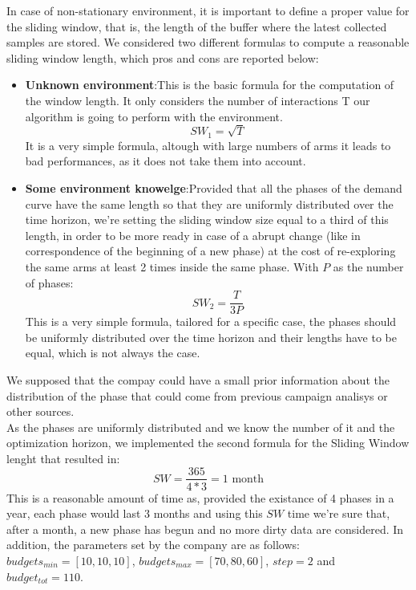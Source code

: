 In case of non-stationary environment, it is important to define a
proper value for the sliding window, that is, the length of the buffer where the latest
collected samples are stored. We considered two different formulas to compute a
reasonable sliding window length, which pros and cons are reported below:

\begin{itemize}
	\item \textbf{Unknown environment}:\@  This is the basic formula for the computation of the window length. It only considers the number of interactions T our algorithm is going to perform
	with the environment.
	$$SW_1 = \sqrt{T}$$
	It is a very simple formula, altough with large numbers of arms it leads to bad performances, as it does not take them into account.
	
	\item \textbf{Some environment knowelge}:\@  Provided that all the phases of the demand curve have the same length so that they are uniformly distributed over the time horizon, we’re setting the sliding window size equal to a third of this length, in order to be more ready in case of a abrupt change (like in correspondence of the beginning
	of a new phase) at the cost of re-exploring the same arms at least 2 times inside the same phase. With $P$ as the number of phases:
	$$SW_2 = \dfrac{T}{3P}$$
	This is a very simple formula, tailored for a specific case, the phases should be uniformly distributed over the time horizon
	and their lengths have to be equal, which is not always the case.	
\end{itemize} 

We supposed that the compay could have a small prior information about the distribution of the phase that could come from previous campaign analisys or other sources.
\\As the phases are uniformly distributed and we know the number of it and the optimization horizon, we implemented the second formula for the Sliding Window lenght that resulted in:
$$SW = \dfrac{365}{4*3} = 1 \text{ month}$$
This is a reasonable amount of time as, provided the existance of 4 phases in a year, each phase would last 3 months and using this $SW$ time we're sure that, after a month, a new phase has begun and no more dirty data are considered.
In addition, the parameters set by the company are as follows:
$budgets_{min} = [10, 10, 10]$, $budgets_{max} = [70, 80, 60]$, $step = 2$ and $budget_{tot} = 110$.